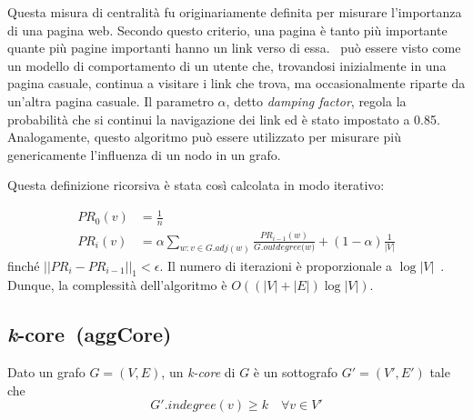 Questa misura di centralità fu originariamente definita per misurare l'importanza di una pagina web. 
Secondo questo criterio, una pagina è tanto più importante quante più pagine importanti hanno un link 
verso di essa. 
\PageRank\ può essere visto come un modello di comportamento di un utente che, trovandosi inizialmente
in una pagina casuale, continua a visitare i link che trova, ma occasionalmente riparte da un'altra 
pagina casuale.
Il parametro $\alpha$, detto \emph{damping factor}, regola la probabilità che si continui la navigazione dei link
ed è stato impostato a \num{0.85}.
Analogamente, questo algoritmo può essere utilizzato per misurare più genericamente l'influenza di un nodo 
in un grafo.

Questa definizione ricorsiva è stata così calcolata in modo iterativo: 

\begin{equation*}
    \begin{split}
\mathit{PR}_0(v)&= \frac{1}{n}\\
\mathit{PR}_i(v)&= \alpha \sum_{w : v \in G.\mathit{adj}(w)} 
\frac{\mathit{PR}_{i-1}(w)}{G.\mathit{outdegree(}w)} + 
(1-\alpha)\frac{1}{|V|}
    \end{split}
\end{equation*}
finché $||\mathit{PR}_{i} - \mathit{PR}_{i-1}||_1 < \epsilon$. Il numero di iterazioni 
è proporzionale a $\log{|V|}$~\cite{page:pagerank}. Dunque, la complessità dell'algoritmo è $O((|V| + |E|)\log{|V|})$.


\subsection{\emph{k}-core~(aggCore)}
\begin{definizione}[\kcore]
    \label{def:kcore}
    Dato un grafo $G=(V, E)$, un \emph{k-core} di $G$ è un sottografo $G'=(V',E')$
    tale che 
    \begin{equation*}
        G'.\mathit{indegree}(v) \geq k \quad \forall v \in V'
    \end{equation*}
\end{definizione}

